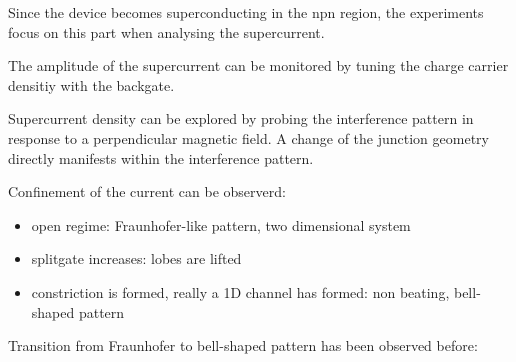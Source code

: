 Since the device becomes superconducting in the npn region, the experiments focus on this part when analysing the supercurrent.

The amplitude of the supercurrent can be monitored by tuning the charge carrier densitiy with the backgate. 

Supercurrent density can be explored by probing the interference pattern in response to a perpendicular magnetic field.  A change of the junction geometry directly manifests within the interference pattern. 

Confinement of the current can be observerd: 
\begin{itemize}
\item open regime: Fraunhofer-like pattern, two dimensional system
\item splitgate increases: lobes are lifted
\item constriction is formed, really a 1D channel has formed: non beating, bell-shaped pattern
\end{itemize}

Transition from Fraunhofer to bell-shaped pattern has been observed before: \cite{Chiodi2012}
